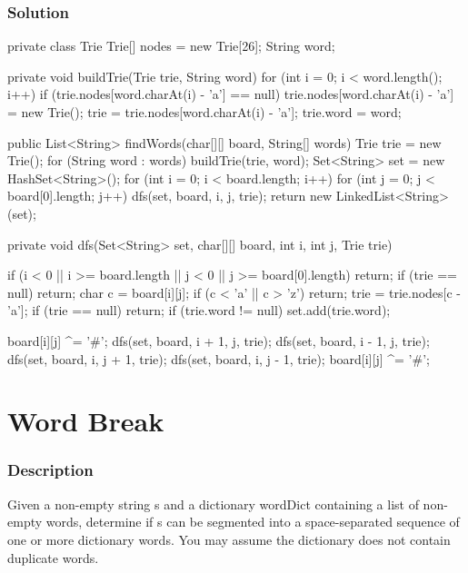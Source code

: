 \subsubsection{Solution}

\begin{Code}
private class Trie {
    Trie[] nodes = new Trie[26];
    String word;
}

private void buildTrie(Trie trie, String word) {
    for (int i = 0; i < word.length(); i++) {
        if (trie.nodes[word.charAt(i) - 'a'] == null) {
            trie.nodes[word.charAt(i) - 'a'] = new Trie();
        }
        trie = trie.nodes[word.charAt(i) - 'a'];
    }
    trie.word = word;
}
\end{Code}

\newpage

\begin{Code}

public List<String> findWords(char[][] board, String[] words) {
    Trie trie = new Trie();
    for (String word : words) {
        buildTrie(trie, word);
    }
    Set<String> set = new HashSet<String>();
    for (int i = 0; i < board.length; i++) {
        for (int j = 0; j < board[0].length; j++) {
            dfs(set, board, i, j, trie);
        }
    }
    return new LinkedList<String>(set);
}

private void dfs(Set<String> set, char[][] board, int i, int j, Trie trie) {
    if (i < 0 || i >= board.length || j < 0 || j >= board[0].length) {
        return;
    }
    if (trie == null) {
        return;
    }
    char c = board[i][j];
    if (c < 'a' || c > 'z') {
        return;
    }
    trie = trie.nodes[c - 'a'];
    if (trie == null) {
        return;
    }
    if (trie.word != null) {
        set.add(trie.word);
    }

    board[i][j] ^= '#';
    dfs(set, board, i + 1, j, trie);
    dfs(set, board, i - 1, j, trie);
    dfs(set, board, i, j + 1, trie);
    dfs(set, board, i, j - 1, trie);
    board[i][j] ^= '#';
}
\end{Code}

\newpage

\section{Word Break}

\subsubsection{Description}
Given a non-empty string s and a dictionary wordDict containing a list of non-empty words, determine if s can be segmented into a space-separated sequence of one or more dictionary words. You may assume the dictionary does not contain duplicate words.

